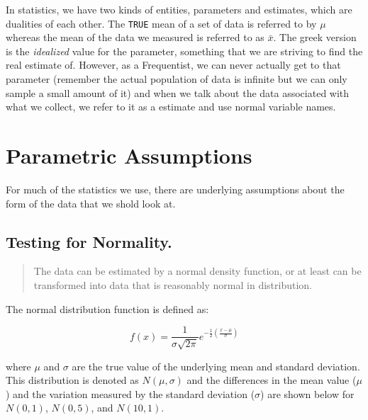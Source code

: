 \documentclass[
  letterpaper,
]{book}
\begin{document}
In statistics, we have two kinds of entities, parameters and estimates,
which are dualities of each other. The \texttt{TRUE} mean of a set of
data is referred to by \(\mu\) whereas the mean of the data we measured
is referred to as \(\bar{x}\). The greek version is the \emph{idealized}
value for the parameter, something that we are striving to find the real
estimate of. However, as a Frequentist, we can never actually get to
that parameter (remember the actual population of data is infinite but
we can only sample a small amount of it) and when we talk about the data
associated with what we collect, we refer to it as a estimate and use
normal variable names.

\section{Parametric Assumptions}\label{parametric-assumptions}

For much of the statistics we use, there are underlying assumptions
about the form of the data that we shold look at.

\subsection{Testing for Normality.}\label{testing-for-normality.}

\begin{quote}
The data can be estimated by a normal density function, or at least can
be transformed into data that is reasonably normal in distribution.
\end{quote}

The normal distribution function is defined as:

\[
f(x) = \frac{1}{\sigma\sqrt{2\pi}}e^{-\frac{1}{2}(\frac{x - \mu}{\sigma})}
\]

where \(\mu\) and \(\sigma\) are the true value of the underlying mean
and standard deviation. This distribution is denoted as
\(N(\mu,\sigma)\) and the differences in the mean value (\(\mu\)) and
the variation measured by the standard deviation (\(\sigma\)) are shown
below for \(N(0,1)\), \(N(0,5)\), and \(N(10,1)\).
\end{document}

